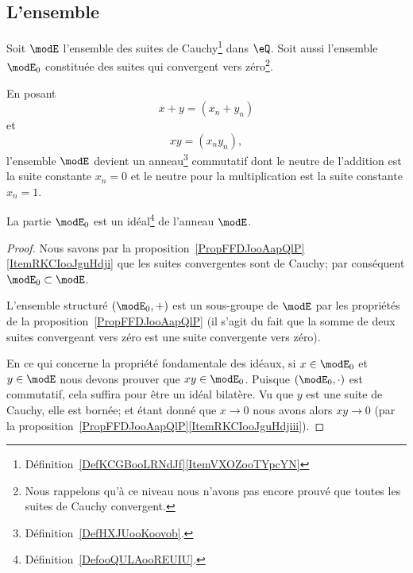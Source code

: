 \subsection{L'ensemble}

\begin{definition}	\label{DEFooGXOPooFReesm}
	Soit \( \modE\) l'ensemble des suites de Cauchy\footnote{Définition~\ref{DefKCGBooLRNdJf}\ref{ItemVXOZooTYpcYN}} dans \( \eQ\). Soit aussi l'ensemble \( \modE_0\) constituée des suites qui convergent vers zéro\footnote{Nous rappelons qu'à ce niveau nous n'avons pas encore prouvé que toutes les suites de Cauchy convergent.}.
\end{definition}

\begin{proposition}	\label{PROPooCYPMooRwMUnI}
	En posant
	\begin{equation}
		x+y=(x_n+y_n)
	\end{equation}
	et
	\begin{equation}
		xy=(x_ny_n),
	\end{equation}
	l'ensemble \( \modE\) devient un anneau\footnote{Définition~\ref{DefHXJUooKoovob}.} commutatif dont le neutre de l'addition est la suite constante \( x_n=0\) et le neutre pour la multiplication est la suite constante \( x_n=1\).
\end{proposition}


\begin{proposition}     \label{PROPooNUQVooAAkicK}
	La partie \( \modE_0\) est un idéal\footnote{Définition~\ref{DefooQULAooREUIU}.} de l'anneau \( \modE\).
\end{proposition}

\begin{proof}
	Nous savons par la proposition~\ref{PropFFDJooAapQlP}\ref{ItemRKCIooJguHdji} que les suites convergentes sont de Cauchy; par conséquent \( \modE_0\subset\modE\).

	L'ensemble structuré \( (\modE_0,+)\) est un sous-groupe de \( \modE\) par les propriétés de la proposition~\ref{PropFFDJooAapQlP} (il s'agit du fait que la somme de deux suites convergeant vers zéro est une suite convergente vers zéro).

	En ce qui concerne la propriété fondamentale des idéaux, si \( x\in\modE_0\) et \( y\in\modE\) nous devons prouver que \( xy\in \modE_0\). Puisque \( (\modE_0,\cdot)\) est commutatif, cela suffira pour être un idéal bilatère. Vu que \( y\) est une suite de Cauchy, elle est bornée; et étant donné que \( x\to 0\) nous avons alors \( xy\to 0\) (par la proposition~\ref{PropFFDJooAapQlP}\ref{ItemRKCIooJguHdjiii}).
\end{proof}

